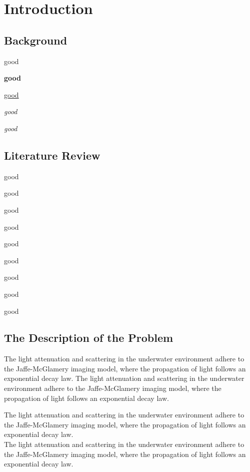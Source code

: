 \section{Introduction}


\subsection{Background}


good

\textbf{good}


\underline{good}


\textsl{good}


\emph{good}





\subsection{Literature Review}



good

{\tiny good}

{\scriptsize good}

{\footnotesize good}

{\small good}

{\large good}

{\LARGE good}

{\huge good}

{\Huge good}






\subsection{The Description of the Problem}



The light attenuation and scattering in the underwater environment adhere to the Jaffe-McGlamery imaging model, where the propagation of light follows an exponential decay law.
The light attenuation and scattering in the underwater environment adhere to the Jaffe-McGlamery imaging model, where the propagation of light follows an exponential decay law.


The light attenuation and scattering in the underwater environment adhere to the Jaffe-McGlamery imaging model, where the propagation of light follows an exponential decay law.\\
The light attenuation and scattering in the underwater environment adhere to the Jaffe-McGlamery imaging model, where the propagation of light follows an exponential decay law.


